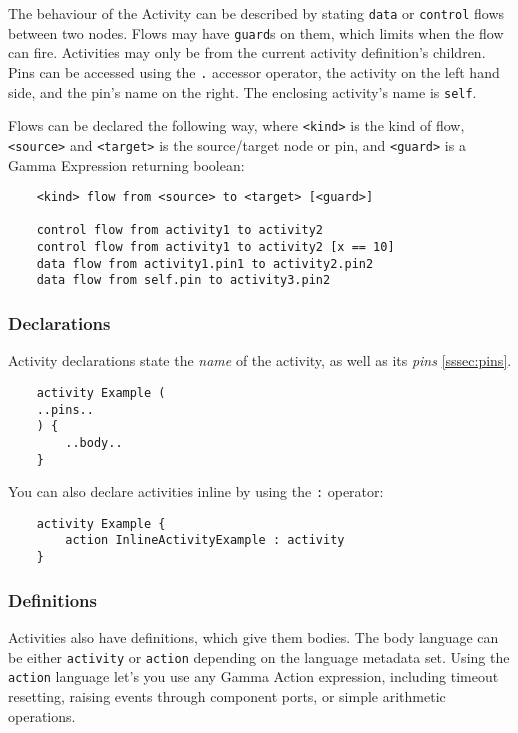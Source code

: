 The behaviour of the Activity can be described by stating \verb|data| or \verb|control| flows between two nodes. Flows may have \verb|guard|s on them, which limits when the flow can fire. Activities may only be from the current activity definition's children. Pins can be accessed using the \verb|.| accessor operator, the activity on the left hand side, and the pin's name on the right. The enclosing activity's name is \verb|self|.

Flows can be declared the following way, where \verb|<kind>| is the kind of flow, \verb|<source>| and \verb|<target>| is the source/target node or pin, and \verb|<guard>| is a Gamma Expression returning boolean:

\begin{verbatim}
	<kind> flow from <source> to <target> [<guard>]
	
	control flow from activity1 to activity2
	control flow from activity1 to activity2 [x == 10]
	data flow from activity1.pin1 to activity2.pin2
	data flow from self.pin to activity3.pin2
\end{verbatim}

\subsubsection*{Declarations}

Activity declarations state the \emph{name} of the activity, as well as its \emph{pins} \ref{sssec:pins}. 

\begin{lstlisting}
	activity Example (
	..pins..
	) {
		..body..
	}
\end{lstlisting}

You can also declare activities inline by using the \verb|:| operator:

\begin{lstlisting}
	activity Example {
		action InlineActivityExample : activity
	}
\end{lstlisting}

\subsubsection*{Definitions}

Activities also have definitions, which give them bodies. The body language can be either \verb|activity| or \verb|action| depending on the language metadata set. Using the \verb|action| language let's you use any Gamma Action expression, including timeout resetting, raising events through component ports, or simple arithmetic operations.

